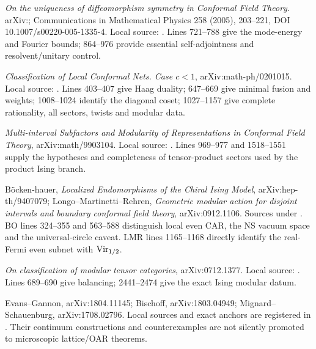\begin{description}[style=nextline]
\item[CW: Carpi--Weiner.]
\emph{On the uniqueness of diffeomorphism symmetry in Conformal Field Theory}.
arXiv:; Communications in Mathematical Physics 258 (2005),
203--221, DOI 10.1007/s00220-005-1335-4. Local source:
.
Lines 721--788 give the mode-energy and Fourier bounds; 864--976 provide
essential self-adjointness and resolvent/unitary control.

\item[KL: Kawahigashi--Longo.]
\emph{Classification of Local Conformal Nets. Case $c<1$},
arXiv:math-ph/0201015. Local source:
.
Lines 403--407 give Haag duality; 647--669 give minimal fusion and weights;
1008--1024 identify the diagonal coset; 1027--1157 give complete rationality,
all sectors, twists and modular data.

\item[KLM: Kawahigashi--Longo--M\"uger.]
\emph{Multi-interval Subfactors and Modularity of Representations in
Conformal Field Theory}, arXiv:math/9903104. Local source:
.
Lines 969--977 and 1518--1551 supply the hypotheses and completeness of
tensor-product sectors used by the product Ising branch.

\item[BO and LMR: the Ising observable bridge.]
B\"ocken-hauer, \emph{Localized Endomorphisms of the Chiral Ising Model},
arXiv:hep-th/9407079; Longo--Martinetti--Rehren,
\emph{Geometric modular action for disjoint intervals and boundary
conformal field theory}, arXiv:0912.1106. Sources under
.
BO lines 324--355 and 563--588 distinguish local even CAR, the NS vacuum
space and the universal-circle caveat. LMR lines 1165--1168 directly identify
the real-Fermi even subnet with $\operatorname{Vir}_{1/2}$.

\item[RSW: Rowell--Stong--Wang.]
\emph{On classification of modular tensor categories}, arXiv:0712.1377.
Local source:
.
Lines 689--690 give balancing; 2441--2474 give the exact Ising modular datum.

\item[Realization alternatives and fidelity counterexamples.]
Evans--Gannon, arXiv:1804.11145; Bischoff, arXiv:1803.04949;
Mignard--Schauenburg, arXiv:1708.02796. Local sources and exact anchors are
registered in .
Their continuum constructions and counterexamples are not silently promoted
to microscopic lattice/OAR theorems.


\end{description}
